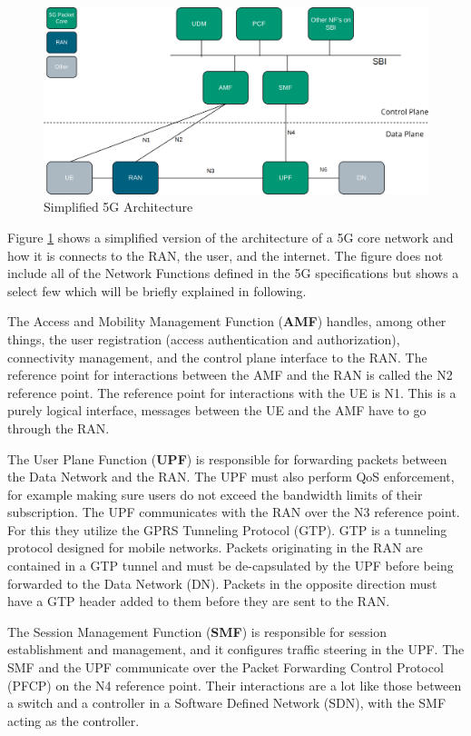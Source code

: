 \begin{figure}[ht]
    \centering
	\includegraphics[width=\linewidth]{fig/core.png}
	\caption{Simplified 5G Architecture}
	\label{fig:core}
\end{figure} 

Figure \ref{fig:core} shows a simplified version of the architecture of a 5G core network and how it is connects to the RAN, the user, and the internet. The figure does not include all of the Network Functions defined in the 5G specifications but shows a select few which will be briefly explained in following.

The Access and Mobility Management Function (\textbf{AMF}) handles, among other things, the user registration (access authentication and authorization), connectivity management, and the control plane interface to the RAN. The reference point for interactions between the AMF and the RAN is called the N2 reference point. The reference point for interactions with the UE is N1. This is a purely logical interface, messages between the UE and the AMF have to go through the RAN.

The User Plane Function (\textbf{UPF}) is responsible for forwarding packets between the Data Network and the RAN. The UPF must also perform QoS enforcement, for example making sure users do not exceed the bandwidth limits of their subscription. The UPF communicates with the RAN over the N3 reference point. For this they utilize the GPRS Tunneling Protocol (GTP). GTP is a tunneling protocol designed for mobile networks. Packets originating in the RAN are contained in a GTP tunnel and must be de-capsulated by the UPF before being forwarded to the Data Network (DN). Packets in the opposite direction must have a GTP header added to them before they are sent to the RAN.

The Session Management Function (\textbf{SMF}) is responsible for session establishment and management, and it configures traffic steering in the UPF. The SMF and the UPF communicate over the Packet Forwarding Control Protocol (PFCP) on the N4 reference point. Their interactions are a lot like those between a switch and a controller in a Software Defined Network (SDN), with the SMF acting as the controller.

